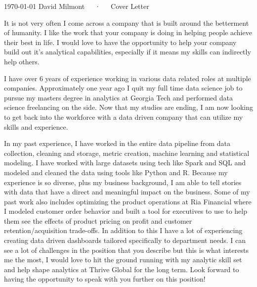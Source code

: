 \documentclass[11pt, a4paper]{awesome-cv}
\begin{document}
\makecvheader[R]

\makecvfooter
  {\today}
  {David Milmont~~~·~~~Cover Letter}
  {}

\makelettertitle

\begin{cvletter}

It is not very often I come across a company that is built around the betterment of humanity. I like the work that your company is doing in helping people achieve their best in life. I would love to have the opportunity to help your company build out it's analytical capabilities, especially if it means my skills can indirectly help others. 

I have over 6 years of experience working in various data related roles at multiple companies. Approximately one year ago I quit my full time data science job to pursue my masters degree in analytics at Georgia Tech and performed data science freelancing on the side. Now that my studies are ending, I am now looking to get back into the workforce with a data driven company that can utilize my skills and experience. 

In my past experience, I have worked in the entire data pipeline from data collection, cleaning and storage, metric creation, machine learning and statistical modeling. I have worked with large datasets using tech like Spark and SQL and modeled and cleaned the data using tools like Python and R. Because my experience is so diverse, plus my business background, I am able to tell stories with data that have a direct and meaningful impact on the business. Some of my past work also includes optimizing the product operations at Ria Financial where I modeled customer order behavior and built a tool for executives to use to help them see the effects of product pricing on profit and customer retention/acquisition trade-offs. In addition to this I have a lot of experiencing creating data driven dashboards tailored specifically to department needs. I can see a lot of challenges in the position that you describe but this is what interests me the most, I would love to hit the ground running with my analytic skill set and help shape analytics at Thrive Global for the long term. Look forward to having the opportunity to speak with you further on this position! 

\end{cvletter}


\makeletterclosing
\end{document}
